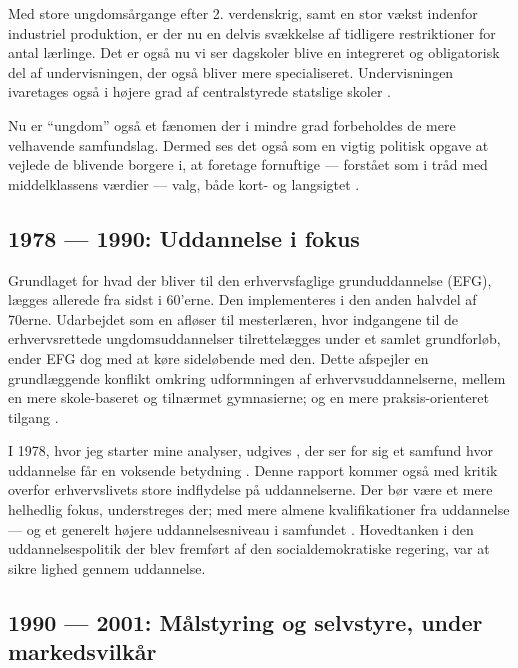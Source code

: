 Med store ungdomsårgange efter 2. verdenskrig, samt en stor vækst indenfor industriel produktion, er der nu en delvis svækkelse af tidligere restriktioner for antal lærlinge.
Det er også nu vi ser dagskoler blive en integreret og obligatorisk del af undervisningen, der også bliver mere specialiseret.
Undervisningen ivaretages også i højere grad af centralstyrede statslige skoler \autocite[s. 35]{bondergaardHistoricalEmergenceKey2014}.

Nu er “ungdom” også et fænomen der i mindre grad forbeholdes de mere velhavende samfundslag.
Dermed ses det også som en vigtig politisk opgave at vejlede de blivende borgere i, at foretage fornuftige — forstået som i tråd med middelklassens værdier — valg, både kort- og langsigtet \autocite[s. 13ff]{juulDiskurserOmUngdom2013}.

\subsection{1978 — 1990: Uddannelse i fokus}
Grundlaget for hvad der bliver til den erhvervsfaglige grunduddannelse (EFG), lægges allerede fra sidst i 60'erne.
Den implementeres i den anden halvdel af 70erne.
Udarbejdet som en afløser til mesterlæren, hvor indgangene til de erhvervsrettede ungdomsuddannelser tilrettelægges under et samlet grundforløb, ender EFG dog med at køre sideløbende med den. 
Dette afspejler en grundlæggende konflikt omkring udformningen af erhvervsuddannelserne, mellem en mere skole-baseret og tilnærmet gymnasierne; og en mere praksis-orienteret tilgang \autocite[s. 49ff, 57]{bondergaardHistoricalEmergenceKey2014}.

I 1978, hvor jeg starter mine analyser, udgives , der ser for sig et samfund hvor uddannelse får en voksende betydning \autocite{undervisningsministeriet90SamletUddannelsesplanlaegning1978}.
Denne rapport kommer også med kritik overfor erhvervslivets store indflydelse på uddannelserne.
Der bør være et mere helhedlig fokus, understreges der; med mere almene kvalifikationer fra uddannelse — og et generelt højere uddannelsesniveau i samfundet \autocite[s 18f]{juulDiskurserOmUngdom2013}.
Hovedtanken i den uddannelsespolitik der blev fremført af den socialdemokratiske regering, var at sikre lighed gennem uddannelse.

\subsection{1990 — 2001: Målstyring og selvstyre, under markedsvilkår}

